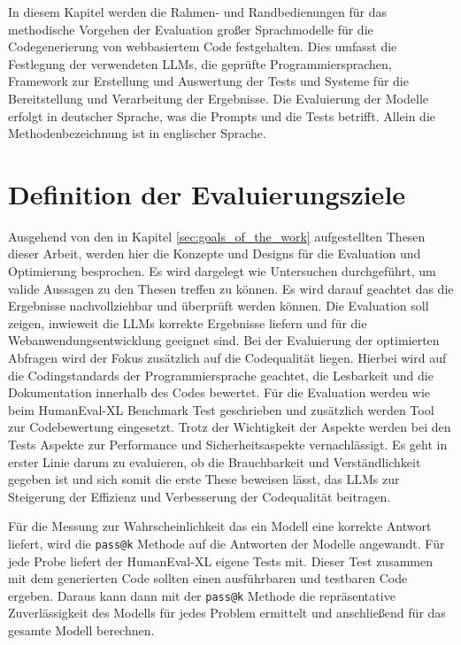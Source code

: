 In diesem Kapitel werden die Rahmen- und Randbedienungen für das methodische Vorgehen der Evaluation großer Sprachmodelle für die Codegenerierung von webbasiertem Code festgehalten. Dies umfasst die Festlegung der verwendeten LLMs, die geprüfte Programmiersprachen, Framework zur Erstellung und Auswertung der Tests und Systeme für die Bereitstellung und Verarbeitung der Ergebnisse. Die Evaluierung der Modelle erfolgt in deutscher Sprache, was die Prompts und die Tests betrifft. Allein die Methodenbezeichnung ist in englischer Sprache.

\section{Definition der Evaluierungsziele}


Ausgehend von den in Kapitel \ref{sec:goals_of_the_work} aufgestellten Thesen dieser Arbeit, werden hier die Konzepte und Designs für die Evaluation und Optimierung besprochen. Es wird dargelegt wie Untersuchen durchgeführt, um valide Aussagen zu den Thesen treffen zu können. Es wird darauf geachtet das die Ergebnisse nachvollziehbar und überprüft werden können.
Die Evaluation soll zeigen, inwieweit die LLMs korrekte Ergebnisse liefern und für die Webanwendungsentwicklung geeignet sind. Bei der Evaluierung der optimierten Abfragen wird der Fokus zusätzlich auf die Codequalität liegen. Hierbei wird auf die Codingstandards der Programmiersprache geachtet, die Lesbarkeit und die Dokumentation innerhalb des Codes bewertet. Für die Evaluation werden wie beim HumanEval-XL Benchmark Test geschrieben und zusätzlich werden Tool zur Codebewertung eingesetzt. Trotz der Wichtigkeit der Aspekte werden bei den Tests Aspekte zur Performance und Sicherheitsaspekte vernachlässigt. Es geht in erster Linie darum zu evaluieren, ob die Brauchbarkeit und Verständlichkeit gegeben ist und sich somit die erste These beweisen lässt, das LLMs zur Steigerung der Effizienz und Verbesserung der Codequalität beitragen.\vspace{0.2cm}

Für die Messung zur Wahrscheinlichkeit das ein Modell eine korrekte Antwort liefert, wird die \texttt{pass@k} Methode auf die Antworten der Modelle angewandt. Für jede Probe liefert der HumanEval-XL eigene Tests mit. Dieser Test zusammen mit dem generierten Code sollten einen ausführbaren und testbaren Code ergeben. Daraus kann dann mit der \texttt{pass@k} Methode die repräsentative Zuverlässigkeit des Modells für jedes Problem ermittelt und anschließend für das gesamte Modell berechnen.\vspace{0.2cm}

